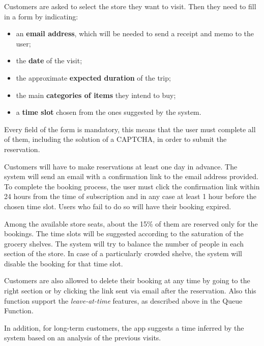 	Customers are asked to select the store they want to visit. Then they need to fill in a form by indicating:
	\begin{itemize}
		\item an \textbf{email address}, which will be needed to send a receipt and memo to the user;
		\item the \textbf{date} of the visit;
		\item the approximate \textbf{expected duration} of the trip;
	 	\item the main \textbf{categories of items} they intend to buy;
	    \item a \textbf{time slot} chosen from the ones suggested by the system.
	\end{itemize}
	Every field of the form is mandatory, this means that the user must complete all of them, including the solution of a CAPTCHA, in order to submit the reservation.

	Customers will have to make reservations at least one day in advance.\newline
	The system will send an email with a confirmation link to the email address provided. To complete the booking process, the user must click the confirmation link within 24 hours from the time of subscription and in any case at least 1 hour before the chosen time slot. Users who fail to do so will have their booking expired.
	
	Among the available store seats, about the 15\% of them are reserved only for the bookings.\newline
	The time slots will be suggested according to the saturation of the grocery shelves.\newline
	The system will try to balance the number of people in each section of the store. In case of a particularly crowded shelve, the system will disable the booking for that time slot.
	
	Customers are also allowed to delete their booking at any time by going to the right section or by clicking the link sent via email after the reservation.
	Also this function support the \textit{leave-at-time} features, as described above in the Queue Function.

	In addition, for long-term customers, the app suggests a time inferred by the system based on an analysis of the previous visits.

